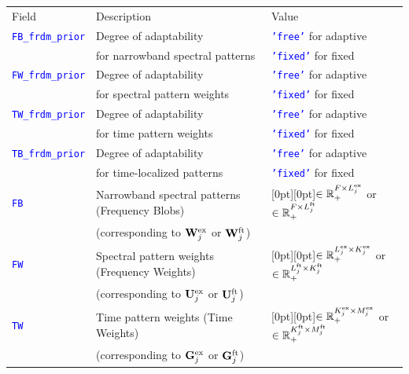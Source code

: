 \documentclass{article}
\newcommand{\matlabcolor}{blue}
\newcommand{\matvar}[1]{\textcolor{\matlabcolor}{\tt {#1}}}
\begin{document}
\begin{table}[t]
  \begin{center}
   \begin{tabular}{l|l|l}
      Field & Description & Value \\
      \hhline{===}
       \matvar{FB\_frdm\_prior} & Degree of adaptability & \matvar{'free'} for adaptive \\
      \hhline{~~-}
                       & for narrowband spectral patterns & \matvar{'fixed'} for fixed \\
      \hhline{---}
       \matvar{FW\_frdm\_prior} & Degree of adaptability & \matvar{'free'} for adaptive \\
      \hhline{~~-}
                       & for spectral pattern weights & \matvar{'fixed'} for fixed \\
      \hhline{---}
       \matvar{TW\_frdm\_prior} & Degree of adaptability & \matvar{'free'} for adaptive \\
      \hhline{~~-}
                       & for time pattern weights & \matvar{'fixed'} for fixed \\
      \hhline{---}
       \matvar{TB\_frdm\_prior} & Degree of adaptability & \matvar{'free'} for adaptive \\
      \hhline{~~-}
                       & for time-localized patterns & \matvar{'fixed'} for fixed \\
      \hhline{---}
       \matvar{FB} & Narrowband spectral patterns (Frequency Blobs) & \raisebox{-5.5pt}[0pt][0pt]{$\in \mathbb R_+^{F \times L^{\rm ex}_j}$ or $\in \mathbb R_+^{F \times L^{\rm ft}_j}$} \\
                   & (corresponding to ${\bf W}^{\rm ex}_j$ or ${\bf W}^{\rm ft}_j$) &  \\
      \hhline{---}
       \matvar{FW} & Spectral pattern weights (Frequency Weights) & \raisebox{-5.5pt}[0pt][0pt]{$\in \mathbb R_+^{L^{\rm ex}_j \times K^{\rm ex}_j}$ or $\in \mathbb R_+^{L^{\rm ft}_j \times K^{\rm ft}_j}$} \\
                   & (corresponding to ${\bf U}^{\rm ex}_j$ or ${\bf U}^{\rm ft}_j$) &  \\
      \hhline{---}
       \matvar{TW} & Time pattern weights (Time Weights) & \raisebox{-5.5pt}[0pt][0pt]{$\in \mathbb R_+^{K^{\rm ex}_j \times M^{\rm ex}_j}$ or $\in \mathbb R_+^{K^{\rm ft}_j \times M^{\rm ft}_j}$} \\
                   & (corresponding to ${\bf G}^{\rm ex}_j$ or ${\bf G}^{\rm ft}_j$) &  \\

\end{tabular}
\end{center}
\end{table}
\end{document}
